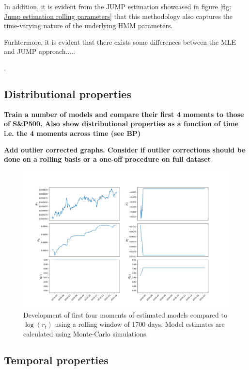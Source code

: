 In addition, it is evident from the JUMP estimation showcased in figure \ref{fig: Jump estimation rolling parameters} that this methodology also captures the time-varying nature of the underlying HMM parameters. 

Furhtermore, it is evident that there exists some differences between the MLE and JUMP approach.....


. 




\subsection{Distributional properties}

\textbf{Train a number of models and compare their first 4 moments to those of S\&P500. Also show distributional properties as a function of time i.e. the 4 moments across time (see BP)}

\textbf{Add outlier corrected graphs. Consider if outlier corrections should be done on a rolling basis or a one-off procedure on full dataset}

\begin{figure}[H] 
    \centering
    \includegraphics[width=1.0\textwidth]{analysis/stylized_facts/2-state JUMP HMM rolling params.png}
    \caption{Development of first four moments of estimated models compared to $\log(r_t)$ using a rolling window of 1700 days. Model estimates are calculated using Monte-Carlo simulations.}
    \label{fig:stylized_facts_rolling_moments} 
\end{figure}


\subsection{Temporal properties}

